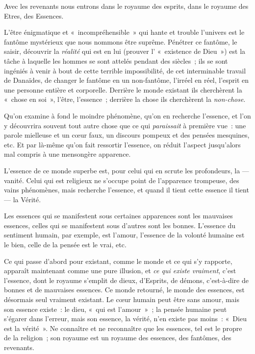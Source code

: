 \documentclass[french,twoside]{book} %
\begin{document}
\noindent Avec les revenants nous entrons dans le royaume des esprits, dans le royaume des Etres, des Essences.\par
L’être énigmatique et « incompréhensible » qui hante et trouble l’univers est le fantôme mystérieux que nous nommons être suprême. Pénétrer ce fantôme, le saisir, découvrir la \emph{réalité} qui est en lui (prouver l’ « existence de Dieu ») est la tâche à laquelle les hommes se sont attelés pendant des siècles ; ils se sont ingéniés à venir à bout de cette terrible impossibilité, de cet interminable travail de Danaïdes, de changer le fantôme en un non-fantôme, l’irréel en réel, l’esprit en une personne entière et corporelle. Derrière le monde existant ils cherchèrent la « chose en soi », l’être, l’essence ; derrière la chose ils cherchèrent la \emph{non-chose}.\par
Qu’on examine à fond le moindre phénomène, qu’on en recherche l’essence, et l’on y découvrira souvent tout autre chose que ce qui \emph{paraissait} à première vue : une parole mielleuse et un cœur faux, un discours pompeux et des pensées mesquines, etc. Et par là-même qu’on fait ressortir l’essence, on réduit l’aspect jusqu’alors mal compris à une mensongère apparence.\par
L’essence de ce monde superbe est, pour celui qui en scrute les profondeurs, la — vanité. Celui qui est religieux ne s’occupe point de l’apparence trompeuse, des vains phénomènes, mais recherche l’essence, et quand il tient cette essence il tient — la Vérité.\par
Les essences qui se manifestent sous certaines apparences sont les mauvaises essences, celles qui se  manifestent sous d’autres sont les bonnes. L’essence du sentiment humain, par exemple, est l’amour, l’essence de la volonté humaine est le bien, celle de la pensée est le vrai, etc.\par
Ce qui passe d’abord pour existant, comme le monde et ce qui s’y rapporte, apparaît maintenant comme une pure illusion, et \emph{ce qui existe vraiment}, c’est l’essence, dont le royaume s’emplit de dieux, d’Esprits, de démons, c’est-à-dire de bonnes et de mauvaises essences. Ce monde retourné, le monde des essences, est désormais seul vraiment existant. Le cœur humain peut être sans amour, mais son essence existe : le dieu, « qui est l’amour » ; la pensée humaine peut s’égarer dans l’erreur, mais son essence, la vérité, n’en existe pas moins : « Dieu est la vérité ». Ne connaître et ne reconnaître que les essences, tel est le propre de la religion ; son royaume est un royaume des essences, des fantômes, des revenants.\par
\end{document}
